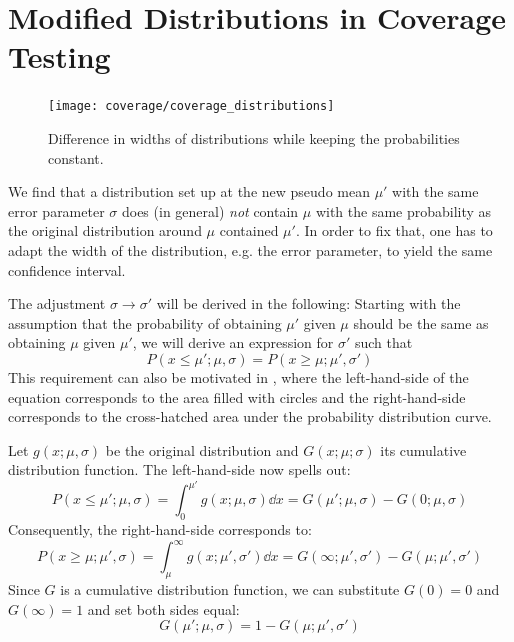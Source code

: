 \newpage
\section{Modified Distributions in Coverage Testing}
\label{app:coverage_uncertainty}


\begin{figure}
    \centering
    \texttt{[image: coverage/coverage\_distributions]}
    \caption{Difference in widths of distributions while keeping the probabilities constant.}
    \label{fig:coverage_distributions}
\end{figure}


We find that a distribution set up at the new pseudo mean $\mu'$ with the same error parameter $\sigma$ does (in general) \emph{not} contain $\mu$ with the same probability as the original distribution around $\mu$ contained $\mu'$.
In order to fix that, one has to adapt the width of the distribution, e.g. the error parameter, to yield the same confidence interval.

The adjustment $\sigma \rightarrow \sigma'$ will be derived in the following:
Starting with the assumption that the probability of obtaining $\mu'$ given $\mu$ should be the same as obtaining $\mu$ given $\mu'$, we will derive an expression for $\sigma'$ such that
\begin{equation}
    P(x \leq \mu'; \mu, \sigma) = P(x \geq \mu; \mu', \sigma')
\end{equation}
This requirement can also be motivated in , where the left-hand-side of the equation corresponds to the area filled with circles and the right-hand-side corresponds to the cross-hatched area under the probability distribution curve.

Let $g(x; \mu, \sigma)$ be the original distribution and $G(x; \mu; \sigma)$ its cumulative distribution function. The left-hand-side now spells out:
\begin{equation}
    P(x \leq \mu'; \mu, \sigma) = \int_0^{\mu'} g(x; \mu, \sigma) \dd{x} = G(\mu'; \mu, \sigma) - G(0; \mu, \sigma)
\end{equation}
Consequently, the right-hand-side corresponds to:
\begin{equation}
    P(x \geq \mu; \mu', \sigma) = \int_\mu^\infty g(x; \mu', \sigma') \dd{x} = G(\infty; \mu', \sigma') - G(\mu; \mu', \sigma')
\end{equation}
Since $G$ is a cumulative distribution function, we can substitute $G(0) = 0$ and $G(\infty) = 1$ and set both sides equal:
\begin{equation}
    G(\mu'; \mu, \sigma) = 1 - G(\mu; \mu', \sigma')
\end{equation}

